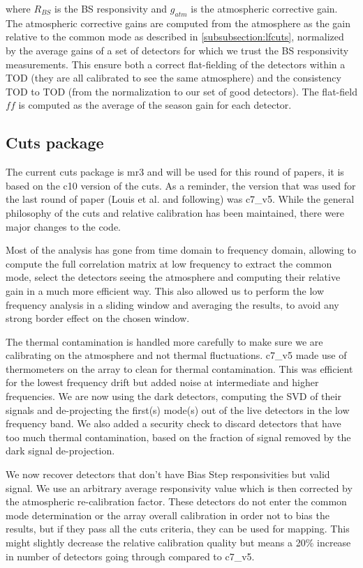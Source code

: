 \documentclass[a4paper, 11pt]{article}
\begin{document}
where $R_{BS}$ is the BS responsivity and $g_{atm}$ is the atmospheric corrective gain. The atmospheric corrective gains are computed from the atmosphere as the gain relative to the common mode as described in \ref{subsubsection:lfcuts}, normalized by the average gains of a set of detectors for which we trust the BS responsivity measurements. This ensure both a correct flat-fielding of the detectors within a TOD (they are all calibrated to see the same atmosphere) and the consistency TOD to TOD (from the normalization to our set of good detectors). The flat-field $ff$ is computed as the average of the season gain for each detector.
	

\subsection{Cuts package}
The current cuts package is mr3 and will be used for this round of papers, it is based on the c10 version of the cuts. As a reminder, the version that was used for the last round of paper (Louis et al. and following) was c7\_v5. While the general philosophy of the cuts and relative calibration has been maintained, there were major changes to the code. 

Most of the analysis has gone from time domain to frequency domain, allowing to compute the full correlation matrix at low frequency to extract the common mode, select the detectors seeing the atmosphere and computing their relative gain in a much more efficient way. This also allowed us to perform the low frequency analysis in a sliding window and averaging the results, to avoid any strong border effect on the chosen window.

The thermal contamination is handled more carefully to make sure we are calibrating on the atmosphere and not thermal fluctuations. c7\_v5 made use of thermometers on the array to clean for thermal contamination. This was efficient for the lowest frequency drift but added noise at intermediate and higher frequencies. We are now using the dark detectors, computing the SVD of their signals and de-projecting the first(s) mode(s) out of the live detectors in the low frequency band. We also added a security check to discard detectors that have too much thermal contamination, based on the fraction of signal removed by the dark signal de-projection.

We now recover detectors that don't have Bias Step responsivities but valid signal. We use an arbitrary average responsivity value which is then corrected by the atmospheric re-calibration factor. These detectors do not enter the common mode determination or the array overall calibration in order not to bias the results, but if they pass all the cuts criteria, they can be used for mapping. This might slightly decrease the relative calibration quality but means a 20\% increase in number of detectors going through compared to c7\_v5.
\end{document}
